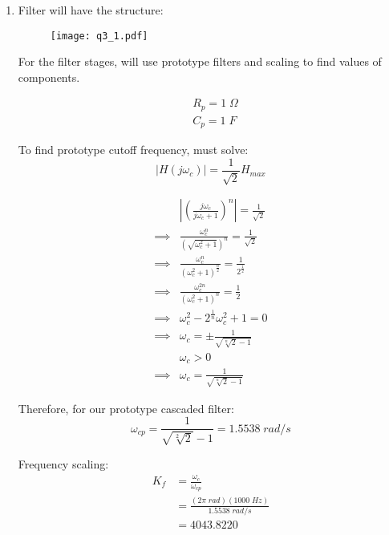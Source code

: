 \def \Cp{1 \; F}
\def \Rp{1 \; \Omega}
\def \C{100 \; nF}
\def \wc{(2\pi \; rad)(1000 \; Hz) }
\def \wcp{1.5538 \; rad/s}
\def \Kf{4043.8220}
\def \Km{2472.9081}
\def \R{2472.9081 \; \Omega}
\def \wh{4.0438 \times 10^3}
\begin{enumerate}
	
	\item{
	
	Filter will have the structure:
	
	\begin{figure}[H]
	\begin{center}
	\texttt{[image: q3\_1.pdf]}
	\end{center}
	\end{figure}
	
	For the filter stages, will use prototype filters and scaling to find values of components.
	
	\begin{align*}
	&R_p = \Rp
	\\
	&C_p = \Cp
	\end{align*}		
	
	To find prototype cutoff frequency, must solve:
	$$ |H(j\omega_c)| = \frac{1}{\sqrt{2}} H_{max} $$
	
	\begin{align*}
	& \left| \left( \frac{j \omega_c}{j \omega_c + 1} \right)^n \right| = \frac{1}{\sqrt{2}}
	\\
	\implies & \frac{\omega_c^n}{\left( \sqrt{\omega_c^2 + 1} \right)^n} = \frac{1}{\sqrt{2}}
	\\
	\implies & \frac{\omega_c^n}{\left( \omega_c^2 + 1 \right)^{\frac{n}{2}}} = \frac{1}{2^{\frac{1}{2}}}
	\\
	\implies & \frac{\omega_c^{2n}}{\left( \omega_c^2 + 1  \right)^n} = \frac{1}{2}
	\\
	\implies & \omega_c^2 - 2^{\frac{1}{n}}\omega_c^2 + 1 = 0
	\\
	\implies & \omega_c = \pm \frac{1}{\sqrt{\sqrt[n]{2} - 1}}
	\\
	&\omega_c > 0
	\\
	\implies & \omega_c =  \frac{1}{\sqrt{\sqrt[n]{2} - 1}}
	\end{align*}	
	
	Therefore, for our prototype cascaded filter:
	$$ \omega_{cp} = \frac{1}{\sqrt{\sqrt[2]{2}} - 1} = \wcp $$	
	
	Frequency scaling: 
	\begin{align*}
	K_f &= \frac{\omega_c}{\omega_{cp}}
	\\
	&= \frac{\wc}{\wcp}
	\\
	&= \Kf
	\end{align*}
	
}
\end{enumerate}
